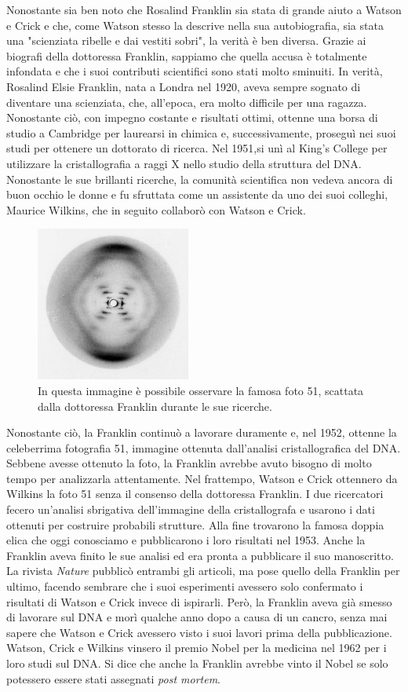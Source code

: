\documentclass[11pt]{report}
\begin{document}
	Nonostante sia ben noto che Rosalind Franklin sia stata di grande aiuto a Watson e Crick e che, come Watson stesso la descrive nella sua autobiografia, sia stata una "scienziata ribelle e dai vestiti sobri", la verità è ben diversa. Grazie ai biografi della dottoressa Franklin, sappiamo che quella accusa è totalmente infondata e che i suoi contributi scientifici sono stati molto sminuiti. In verità, Rosalind Elsie Franklin, nata a Londra nel 1920, aveva sempre sognato di diventare una scienziata, che, all'epoca, era molto difficile per una ragazza. Nonostante ciò, con impegno costante e risultati ottimi, ottenne una borsa di studio a Cambridge per laurearsi in chimica e, successivamente, proseguì nei suoi studi per ottenere un dottorato di ricerca. Nel 1951,si unì al King's College per utilizzare la cristallografia a raggi X nello studio della struttura del DNA. Nonostante le sue brillanti ricerche, la comunità scientifica non vedeva ancora di buon occhio le donne e fu sfruttata come un assistente da uno dei suoi colleghi, Maurice Wilkins, che in seguito collaborò con Watson e Crick.
	\begin{figure}
		\includegraphics[width=2in]{foto51.jpg}
		\caption{{\small In questa immagine è possibile osservare la famosa foto 51, scattata dalla dottoressa Franklin durante le sue ricerche.}}
	\end{figure}
	Nonostante ciò, la Franklin continuò a lavorare duramente e, nel 1952, ottenne la celeberrima fotografia 51, immagine ottenuta dall'analisi cristallografica del DNA. Sebbene avesse ottenuto la foto, la Franklin avrebbe avuto bisogno di molto tempo per analizzarla attentamente. Nel frattempo, Watson e Crick ottennero da Wilkins la foto 51 senza il consenso della dottoressa Franklin. I due ricercatori fecero un'analisi sbrigativa dell'immagine della cristallografa e usarono i dati ottenuti per costruire probabili strutture. Alla fine trovarono la famosa doppia elica che oggi conosciamo e pubblicarono i loro risultati nel 1953. Anche la Franklin aveva finito le sue analisi ed era pronta a pubblicare il suo manoscritto. La rivista \textit{Nature} pubblicò entrambi gli articoli, ma pose quello della Franklin per ultimo, facendo sembrare che i suoi esperimenti avessero solo confermato i risultati di Watson e Crick invece di ispirarli. Però, la Franklin aveva già smesso di lavorare sul DNA e morì qualche anno dopo a causa di un cancro, senza mai sapere che Watson e Crick avessero visto i suoi lavori prima della pubblicazione. Watson, Crick e Wilkins vinsero il premio Nobel per la medicina nel 1962 per i loro studi sul DNA. Si dice che anche la Franklin avrebbe vinto il Nobel se solo potessero essere stati assegnati \textit{post mortem}.
	 
\end{document}
